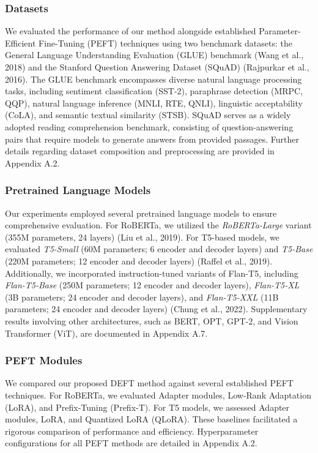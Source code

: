 \documentclass[10pt,twocolumn]{article}
\begin{document}
\subsubsection*{Datasets}
We evaluated the performance of our method alongside established Parameter-Efficient Fine-Tuning (PEFT) techniques using two benchmark datasets: the General Language Understanding Evaluation (GLUE) benchmark (Wang et al., 2018) and the Stanford Question Answering Dataset (SQuAD) (Rajpurkar et al., 2016). The GLUE benchmark encompasses diverse natural language processing tasks, including sentiment classification (SST-2), paraphrase detection (MRPC, QQP), natural language inference (MNLI, RTE, QNLI), linguistic acceptability (CoLA), and semantic textual similarity (STSB). SQuAD serves as a widely adopted reading comprehension benchmark, consisting of question-answering pairs that require models to generate answers from provided passages. Further details regarding dataset composition and preprocessing are provided in Appendix A.2.
\subsubsection*{Pretrained Language Models}
Our experiments employed several pretrained language models to ensure comprehensive evaluation. For RoBERTa, we utilized the \textit{RoBERTa-Large} variant (355M parameters, 24 layers) (Liu et al., 2019). For T5-based models, we evaluated \textit{T5-Small} (60M parameters; 6 encoder and decoder layers) and \textit{T5-Base} (220M parameters; 12 encoder and decoder layers) (Raffel et al., 2019). Additionally, we incorporated instruction-tuned variants of Flan-T5, including \textit{Flan-T5-Base} (250M parameters; 12 encoder and decoder layers), \textit{Flan-T5-XL} (3B parameters; 24 encoder and decoder layers), and \textit{Flan-T5-XXL} (11B parameters; 24 encoder and decoder layers) (Chung et al., 2022). Supplementary results involving other architectures, such as BERT, OPT, GPT-2, and Vision Transformer (ViT), are documented in Appendix A.7.
\subsubsection*{PEFT Modules}
We compared our proposed DEFT method against several established PEFT techniques. For RoBERTa, we evaluated Adapter modules, Low-Rank Adaptation (LoRA), and Prefix-Tuning (Prefix-T). For T5 models, we assessed Adapter modules, LoRA, and Quantized LoRA (QLoRA). These baselines facilitated a rigorous comparison of performance and efficiency. Hyperparameter configurations for all PEFT methods are detailed in Appendix A.2.
\end{document}
